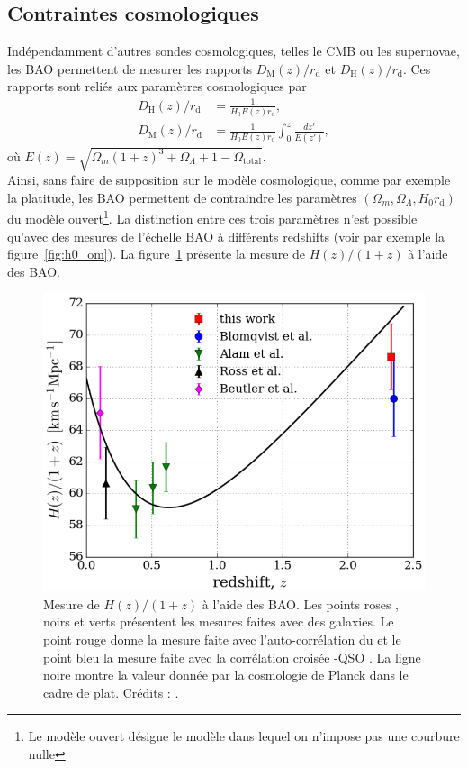 \subsection{Contraintes cosmologiques}
Indépendamment d'autres sondes cosmologiques, telles le CMB ou les supernovae, les BAO permettent de mesurer les rapports $D_{\mathrm{M}}(z) / r_{\mathrm{d}}$ et $D_{\mathrm{H}}(z) / r_{\mathrm{d}}$. Ces rapports sont reliés aux paramètres cosmologiques par
\begin{align}
  D_{\mathrm{H}}(z) / r_{\mathrm{d}} &= \frac{1}{H_0 E(z) r_{\mathrm{d}}}, \\
  D_{\mathrm{M}}(z) / r_{\mathrm{d}} &= \frac{1}{H_0 E(z) r_{\mathrm{d}}} \int_0^z \frac{dz'}{E(z')},
\end{align}
où $E(z) = \sqrt{\Omega_m (1+z)^3 + \Omega_{\Lambda} + 1 - \Omega_{\mathrm{total}}}$. \\
Ainsi, sans faire de supposition sur le modèle cosmologique, comme par exemple la platitude, les BAO permettent de contraindre les paramètres $(\Omega_{m} , \Omega_{\Lambda} , H_0 r_{\mathrm{d}})$ du modèle \lcdm{} ouvert\footnote{Le modèle \lcdm{} ouvert désigne le modèle \lcdm{} dans lequel on n'impose pas une courbure nulle}. 
La distinction entre ces trois paramètres n'est possible qu'avec des mesures de l'échelle BAO à différents redshifts (voir par exemple la figure~\ref{fig:h0_om}).
La figure~\ref{fig:h_vs_z} présente la mesure de $H(z) / (1+z)$ à l'aide des BAO.
\begin{figure}
  \centering
  \includegraphics[scale=0.35]{h_vs_z}
  \caption{Mesure de $H(z) / (1+z)$ à l'aide des BAO. Les points roses \autocite{Beutler2011}, noirs \autocite{Ross2014a} et verts \autocite{Alam2016} présentent les mesures faites avec des galaxies. Le point rouge donne la mesure faite avec l'auto-corrélation du \lya{} \autocite{Agathe2019a} et le point bleu la mesure faite avec la corrélation croisée \lya{}-QSO \autocite{Blomqvist2019a}. La ligne noire montre la valeur donnée par la cosmologie de Planck \autocite{planck_collaboration_planck_2015} dans le cadre de \lcdm{} plat. Crédits : \textcite{Agathe2019a}.}
  \label{fig:h_vs_z}
\end{figure}

